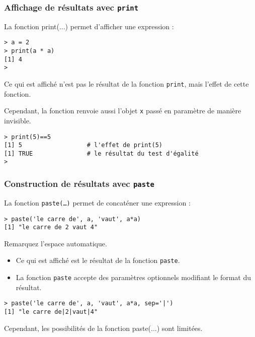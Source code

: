 \documentclass[10pt]{beamer}
\begin{document}
\begin{frame}[fragile]
  \frametitle{Affichage de résultats avec \texttt{print}}
  La fonction print(...) permet d'afficher une expression :
  \begin{lstlisting}
> a = 2
> print(a * a)
[1] 4
>
\end{lstlisting}

Ce qui est affiché n'est pas le résultat de la fonction \texttt{print}, mais l'effet de cette fonction.

Cependant, la fonction renvoie aussi l'objet \texttt{x} passé en paramètre de manière invisible.
\begin{lstlisting}
> print(5)==5
[1] 5                  # l'effet de print(5)
[1] TRUE               # le résultat du test d'égalité
>  
\end{lstlisting}
\end{frame}


\begin{frame}[fragile]
\frametitle{Construction de résultats avec \texttt{paste}}
La fonction \texttt{paste(\dots)} permet de concaténer une expression :
\begin{lstlisting}
> paste('le carre de', a, 'vaut', a*a)
[1] "le carre de 2 vaut 4"  
\end{lstlisting}
Remarquez l'espace automatique.

\begin{itemize}
\item Ce qui est affiché est le \alert{résultat} de la fonction \texttt{paste}.
\item La fonction \texttt{paste} accepte des paramètres optionnels modifiant le format du résultat.
\end{itemize}
\begin{lstlisting}
> paste('le carre de', a, 'vaut', a*a, sep='|')
[1] "le carre de|2|vaut|4"
\end{lstlisting}
Cependant, les possibilités de la fonction paste(...) sont limitées.
  
\end{frame}
\end{document}
